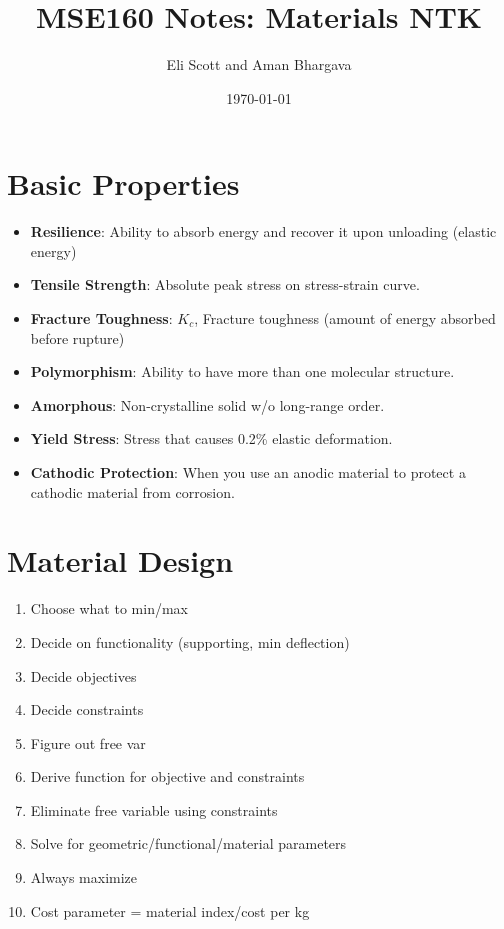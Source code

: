 \documentclass[a4paper,12pt]{report}
\begin{document}
\title{MSE160 Notes: Materials NTK}
\author{Eli Scott and Aman Bhargava}
\date{\today}
\maketitle

\tableofcontents

\section{Basic Properties}
\begin{itemize}
\item \textbf{Resilience}: Ability to absorb energy and recover it upon unloading (elastic energy)
\item \textbf{Tensile Strength}: Absolute peak stress on stress-strain curve.
\item \textbf{Fracture Toughness}: $K_c$, Fracture toughness (amount of energy absorbed before rupture)
\item \textbf{Polymorphism}: Ability to have more than one molecular structure.
\item \textbf{Amorphous}: Non-crystalline solid w/o long-range order.
\item \textbf{Yield Stress}: Stress that causes 0.2\% elastic deformation.
\item \textbf{Cathodic Protection}: When you use an anodic material to protect a cathodic material from corrosion.

\end{itemize}

\section{Material Design}
\begin{enumerate}
\item Choose what to min/max
\item Decide on functionality (supporting, min deflection)
\item Decide objectives
\item Decide constraints
\item Figure out free var
\item Derive function for objective and constraints
\item Eliminate free variable using constraints
\item Solve for geometric/functional/material parameters
\item Always maximize
\item Cost parameter = material index/cost per kg
\end{enumerate}
\end{document}
